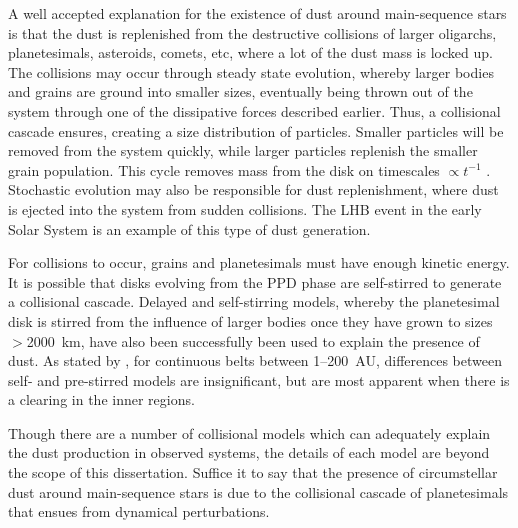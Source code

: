     
    A well accepted explanation for the existence of dust around main-sequence stars is that the dust is replenished from the destructive collisions of larger oligarchs, planetesimals, asteroids, comets, etc, where a lot of the dust mass is locked up. The collisions may occur through steady state evolution, whereby larger bodies and grains are ground into smaller sizes, eventually being thrown out of the system through one of the dissipative forces described earlier. Thus, a collisional cascade ensures, creating a size distribution of particles. Smaller particles will be removed from the system quickly, while larger particles replenish the smaller grain population. This cycle removes mass from the disk on timescales $\propto t^{-1}$ \citep{Wyatt2007}. Stochastic evolution may also be responsible for dust replenishment, where dust is ejected into the system from sudden collisions. The LHB event in the early Solar System is an example of this type of dust generation. 
    
    For collisions to occur, grains and planetesimals must have enough kinetic energy. It is possible that disks evolving from the PPD phase are self-stirred to generate a collisional cascade. Delayed and self-stirring models, whereby the planetesimal disk is stirred from the influence of larger bodies once they have grown to sizes $>$2000~km, have also been successfully been used to explain the presence of dust. As stated by \citet{Wyatt2008}, for continuous belts between 1--200~AU, differences between self- and pre-stirred models are insignificant, but are most apparent when there is a clearing in the inner regions.
    
    Though there are a number of collisional models which can adequately explain the dust production in observed systems, the details of each model are beyond the scope of this dissertation. Suffice it to say that the presence of circumstellar dust around main-sequence stars is due to the collisional cascade of planetesimals that ensues from dynamical perturbations.
    
